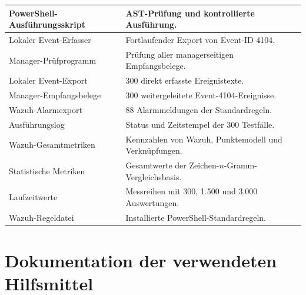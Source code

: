 \documentclass[12pt,a4paper,oneside,parskip=half]{scrreprt}
\begin{document}
\begin{longtable}{|L{3.5cm}|L{4.0cm}|L{5.4cm}|}
\hline
PowerShell-Ausführungsskript & AST-Prüfung und kontrollierte Ausführung. & \\
\hline
Lokaler Event-Erfasser & Fortlaufender Export von Event-ID 4104. & \\
\hline
Manager-Prüfprogramm & Prüfung aller managerseitigen Empfangsbelege. & \\
\hline
Lokaler Event-Export & 300 direkt erfasste Ereignistexte. & \\
\hline
Manager-Empfangsbelege & 300 weitergeleitete Event-4104-Ereignisse. & \\
\hline
Wazuh-Alarmexport & 88 Alarmmeldungen der Standardregeln. & \\
\hline
Ausführungslog & Status und Zeitstempel der 300 Testfälle. & \\
\hline
Wazuh-Gesamtmetriken & Kennzahlen von Wazuh, Punktemodell und Verknüpfungen. & \\
\hline
Statistische Metriken & Gesamtwerte der Zeichen-\(n\)-Gramm-Vergleichsbasis. & \\
\hline
Laufzeitwerte & Messreihen mit 300, 1.500 und 3.000 Auswertungen. & \\
\hline
Wazuh-Regeldatei & Installierte PowerShell-Standardregeln. & \\
\hline
\end{longtable}
\endgroup

\clearpage\chapter*{Dokumentation der verwendeten Hilfsmittel}
\end{document}

